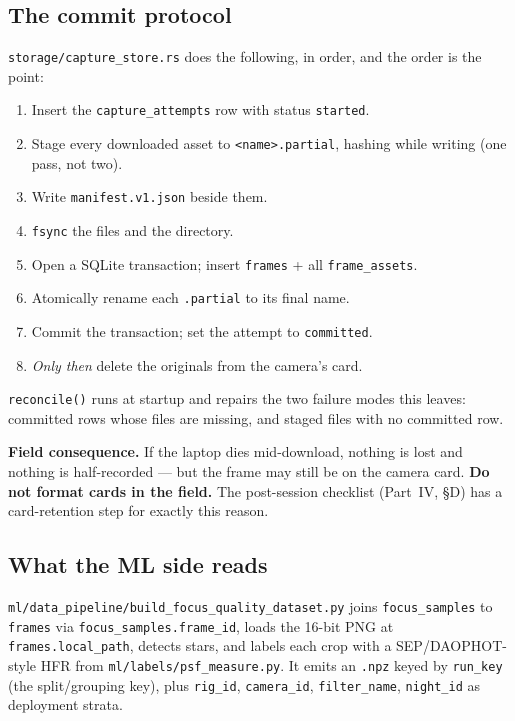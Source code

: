 \documentclass[11pt]{article}
\newcommand{\co}[1]{\texttt{\small #1}}
\begin{document}
\subsection{The commit protocol}

\co{storage/capture\_store.rs} does the following, in order, and the order is
the point:

\begin{enumerate}
\item Insert the \co{capture\_attempts} row with status \co{started}.
\item Stage every downloaded asset to \co{<name>.partial}, hashing while
      writing (one pass, not two).
\item Write \co{manifest.v1.json} beside them.
\item \co{fsync} the files and the directory.
\item Open a SQLite transaction; insert \co{frames} + all \co{frame\_assets}.
\item Atomically rename each \co{.partial} to its final name.
\item Commit the transaction; set the attempt to \co{committed}.
\item \emph{Only then} delete the originals from the camera's card.
\end{enumerate}

\co{reconcile()} runs at startup and repairs the two failure modes this leaves:
committed rows whose files are missing, and staged files with no committed row.

\begin{keybox}
\textbf{Field consequence.} If the laptop dies mid-download, nothing is lost and
nothing is half-recorded --- but the frame may still be on the camera card.
\textbf{Do not format cards in the field.} The post-session checklist (Part~IV,
\S D) has a card-retention step for exactly this reason.
\end{keybox}

\subsection{What the ML side reads}

\co{ml/data\_pipeline/build\_focus\_quality\_dataset.py} joins
\co{focus\_samples} to \co{frames} via \co{focus\_samples.frame\_id}, loads the
16-bit PNG at \co{frames.local\_path}, detects stars, and labels each crop with
a SEP/DAOPHOT-style HFR from \co{ml/labels/psf\_measure.py}. It emits an
\co{.npz} keyed by \co{run\_key} (the split/grouping key), plus \co{rig\_id},
\co{camera\_id}, \co{filter\_name}, \co{night\_id} as deployment strata.
\end{document}
